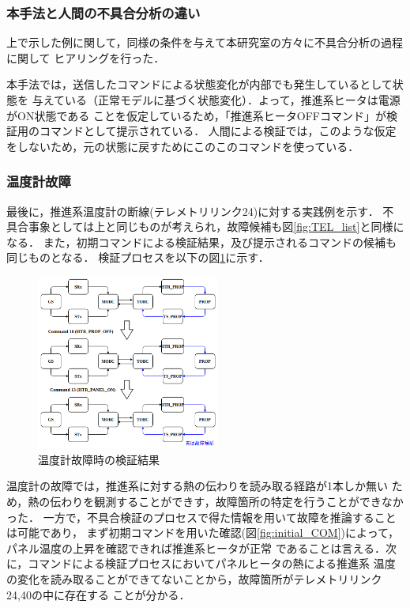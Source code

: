 \documentclass[11pt]{jsarticle}%
\begin{document}
\begin{multicols}{2}
\subsubsection{本手法と人間の不具合分析の違い}
上で示した例に関して，同様の条件を与えて本研究室の方々に不具合分析の過程に関して
ヒアリングを行った．

本手法では，送信したコマンドによる状態変化が内部でも発生しているとして状態を
与えている（正常モデルに基づく状態変化）．よって，推進系ヒータは電源がON状態である
ことを仮定しているため，「推進系ヒータOFFコマンド」が検証用のコマンドとして提示されている．
人間による検証では，このような仮定をしないため，元の状態に戻すためにこのこのコマンドを使っている．

\subsubsection{温度計故障}
最後に，推進系温度計の断線(テレメトリリンク24)に対する実践例を示す．
不具合事象としては上と同じものが考えられ，故障候補も図\ref{fig:TEL_list}と同様になる．
また，初期コマンドによる検証結果，及び提示されるコマンドの候補も同じものとなる．
検証プロセスを以下の図\ref{fig:COM_phase_TS}に示す．
\begin{figure}[H]
  \centering
    \includegraphics[width=6.0cm]{../figure/COM_process_TS_fault.png}
    \caption{温度計故障時の検証結果}
    \label{fig:COM_phase_TS}
\end{figure}
温度計の故障では，推進系に対する熱の伝わりを読み取る経路が1本しか無い
ため，熱の伝わりを観測することができす，故障箇所の特定を行うことができなかった．
一方で，不具合検証のプロセスで得た情報を用いて故障を推論することは可能であり，
まず初期コマンドを用いた確認(図\ref{fig:initial_COM})によって，
パネル温度の上昇を確認できれば推進系ヒータが正常
であることは言える．次に，コマンドによる検証プロセスにおいてパネルヒータの熱による推進系
温度の変化を読み取ることができてないことから，故障箇所がテレメトリリンク24,40の中に存在する
ことが分かる．


\end{multicols}
\end{document}
